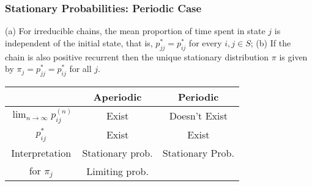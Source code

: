 \subsubsection*{Stationary Probabilities: Periodic Case}
 (a) For irreducible chains, the mean proportion of time spent in state $j$ is independent of the initial state, that is, $p^*_{jj} = p^*_{ij}$ for every $i,j \in S$;
(b) If the chain is also positive recurrent then the unique stationary distribution $\pi$ is given by $\pi_j = p^*_{jj} = p^*_{ij}$ for all $j$.
\newline\begin{tabular}{|c|c|c|}
    \hline
     & Aperiodic & Periodic \\
    \hline
    $\lim_{n \to \infty} p^{(n)}_{ij}$ & Exist & Doesn't Exist \\
    \hline 
    $p^*_{ij}$ & Exist & Exist \\
    \hline 
    Interpretation  & Stationary prob. & Stationary Prob. \\
    for $\pi_j$ & Limiting prob. & \\
    \hline
\end{tabular}